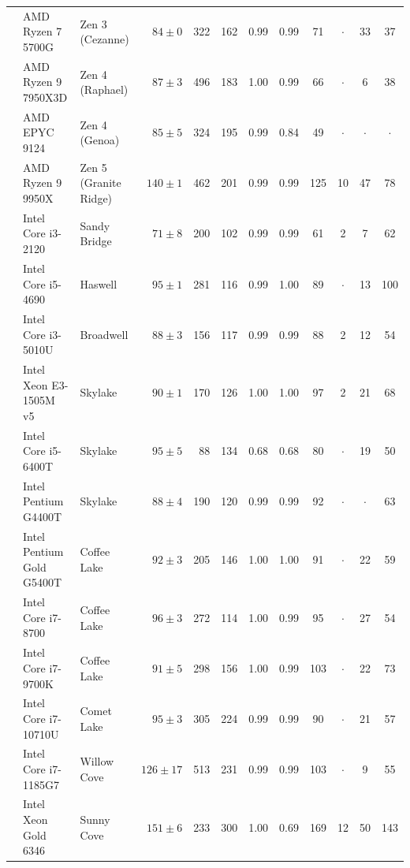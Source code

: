 \begin{tabular}{cll@{\hspace{1em}}rrr@{\hspace{2.5em}}cc@{\hspace{2.5em}}cccc}
 & AMD Ryzen 7 5700G & Zen 3 (Cezanne) & $84 \pm 0$ & 322 & 162 & 0.99 & 0.99 & 71 & $\cdot$ & 33 & 37 \\\cmidrule(lr){2-12}
 & AMD Ryzen 9 7950X3D & Zen 4 (Raphael) & $87 \pm 3$ & 496 & 183 & 1.00 & 0.99 & 66 & $\cdot$ & 6 & 38 \\\cmidrule(lr){2-12}
 & AMD EPYC 9124 & Zen 4 (Genoa) & $85 \pm 5$ & 324 & 195 & 0.99 & 0.84 & 49 & $\cdot$ & $\cdot$ & $\cdot$ \\\cmidrule(lr){2-12}
 & AMD Ryzen 9 9950X & Zen 5 (Granite Ridge) & $140 \pm 1$ & 462 & 201 & 0.99 & 0.99 & 125 & 10 & 47 & 78 \\\cmidrule(lr){2-12}
 & Intel Core i3-2120 & Sandy Bridge & $71 \pm 8$ & 200 & 102 & 0.99 & 0.99 & 61 & 2 & 7 & 62 \\\cmidrule(lr){2-12}
 & Intel Core i5-4690 & Haswell & $95 \pm 1$ & 281 & 116 & 0.99 & 1.00 & 89 & $\cdot$ & 13 & 100 \\\cmidrule(lr){2-12}
 & Intel Core i3-5010U & Broadwell & $88 \pm 3$ & 156 & 117 & 0.99 & 0.99 & 88 & 2 & 12 & 54 \\\cmidrule(lr){2-12}
 & Intel Xeon E3-1505M v5 & Skylake & $90 \pm 1$ & 170 & 126 & 1.00 & 1.00 & 97 & 2 & 21 & 68 \\\cmidrule(lr){2-12}
 & Intel Core i5-6400T & Skylake & $95 \pm 5$ & 88 & 134 & 0.68 & 0.68 & 80 & $\cdot$ & 19 & 50 \\\cmidrule(lr){2-12}
 & Intel Pentium G4400T & Skylake & $88 \pm 4$ & 190 & 120 & 0.99 & 0.99 & 92 & $\cdot$ & $\cdot$ & 63 \\\cmidrule(lr){2-12}
 & Intel Pentium Gold G5400T & Coffee Lake & $92 \pm 3$ & 205 & 146 & 1.00 & 1.00 & 91 & $\cdot$ & 22 & 59 \\\cmidrule(lr){2-12}
 & Intel Core i7-8700 & Coffee Lake & $96 \pm 3$ & 272 & 114 & 1.00 & 0.99 & 95 & $\cdot$ & 27 & 54 \\\cmidrule(lr){2-12}
 & Intel Core i7-9700K & Coffee Lake & $91 \pm 5$ & 298 & 156 & 1.00 & 0.99 & 103 & $\cdot$ & 22 & 73 \\\cmidrule(lr){2-12}
 & Intel Core i7-10710U & Comet Lake & $95 \pm 3$ & 305 & 224 & 0.99 & 0.99 & 90 & $\cdot$ & 21 & 57 \\\cmidrule(lr){2-12}
 & Intel Core i7-1185G7 & Willow Cove & $126 \pm 17$ & 513 & 231 & 0.99 & 0.99 & 103 & $\cdot$ & 9 & 55 \\\cmidrule(lr){2-12}
 & Intel Xeon Gold 6346 & Sunny Cove & $151 \pm 6$ & 233 & 300 & 1.00 & 0.69 & 169 & 12 & 50 & 143 \\\cmidrule(lr){2-12}

\end{tabular}
